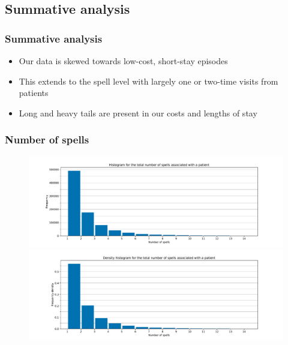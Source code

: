 \documentclass{beamer}
\begin{document}
\subsection{Summative analysis}
\begin{frame}
    \frametitle{Summative analysis}

    \begin{itemize}
        \pause%
        \item Our data is skewed towards low-cost, short-stay episodes
        \pause%
        \item This extends to the spell level with largely one or two-time
            visits from patients
        \pause%
        \item Long and heavy tails are present in our costs and lengths of stay
    \end{itemize}
\end{frame}

\begin{frame}
    \frametitle{Number of spells}

    \begin{figure}
        \begin{minipage}{\linewidth}
        \includegraphics[width=\linewidth]{./img/no_spells_freq_hist.pdf}
        \end{minipage}
        \begin{minipage}{\linewidth}
        \includegraphics[width=\linewidth]{./img/no_spells_density_hist.pdf}
        \end{minipage}
    \end{figure}
\end{frame}
\end{document}
